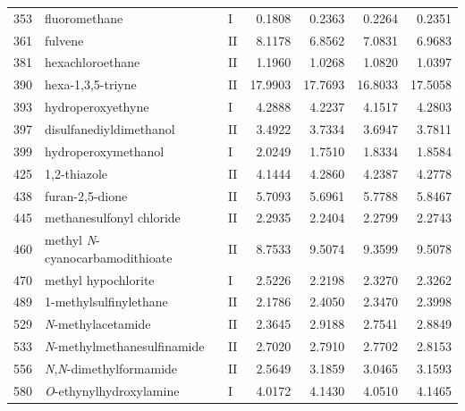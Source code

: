 \begin{longtable}{rlld{2.5}d{2.5}d{2.5}d{2.5}}
    353  & fluoromethane                                          & I  & 0.1808  & 0.2363  & 0.2264  & 0.2351  \\
    361  & fulvene                                                & II & 8.1178  & 6.8562  & 7.0831  & 6.9683  \\
    381  & hexachloroethane                                       & II & 1.1960  & 1.0268  & 1.0820  & 1.0397  \\
    390  & hexa-1,3,5-triyne                                      & II & 17.9903 & 17.7693 & 16.8033 & 17.5058 \\
    393  & hydroperoxyethyne                                      & I  & 4.2888  & 4.2237  & 4.1517  & 4.2803  \\
    397  & disulfanediyldimethanol                                & II & 3.4922  & 3.7334  & 3.6947  & 3.7811  \\
    399  & hydroperoxymethanol                                    & I  & 2.0249  & 1.7510  & 1.8334  & 1.8584  \\
    425  & 1,2-thiazole                                           & II & 4.1444  & 4.2860  & 4.2387  & 4.2778  \\
    438  & furan-2,5-dione                                        & II & 5.7093  & 5.6961  & 5.7788  & 5.8467  \\
    445  & methanesulfonyl chloride                               & II & 2.2935  & 2.2404  & 2.2799  & 2.2743  \\
    460  & methyl \textit{N}-cyanocarbamodithioate                & II & 8.7533  & 9.5074  & 9.3599  & 9.5078  \\
    470  & methyl hypochlorite                                    & I  & 2.5226  & 2.2198  & 2.3270  & 2.3262  \\
    489  & 1-methylsulfinylethane                                 & II & 2.1786  & 2.4050  & 2.3470  & 2.3998  \\
    529  & \textit{N}-methylacetamide                             & II & 2.3645  & 2.9188  & 2.7541  & 2.8849  \\
    533  & \textit{N}-methylmethanesulfinamide                    & II & 2.7020  & 2.7910  & 2.7702  & 2.8153  \\
    556  & \textit{N},\textit{N}-dimethylformamide                & II & 2.5649  & 3.1859  & 3.0465  & 3.1593  \\
    580  & \textit{O}-ethynylhydroxylamine                        & I  & 4.0172  & 4.1430  & 4.0510  & 4.1465  \\

\end{longtable}
